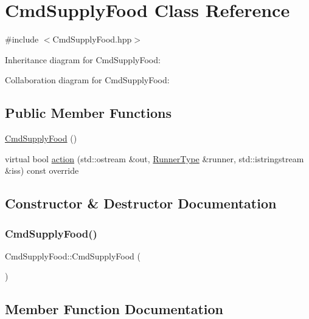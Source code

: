 \hypertarget{classCmdSupplyFood}{}\section{Cmd\+Supply\+Food Class Reference}
\label{classCmdSupplyFood}


{\ttfamily \#include $<$Cmd\+Supply\+Food.\+hpp$>$}



Inheritance diagram for Cmd\+Supply\+Food\+:


Collaboration diagram for Cmd\+Supply\+Food\+:
\subsection*{Public Member Functions}
\begin{DoxyCompactItemize}
\item 
\hyperlink{classCmdSupplyFood_a8cd9e12031a2c93b4d5092920729f88a}{Cmd\+Supply\+Food} ()
\item 
virtual bool \hyperlink{classCmdSupplyFood_a308e5fdbe783d0ba6cf504188d8d41ba}{action} (std\+::ostream \&out, \hyperlink{Command_8hpp_a3594ceaf3c835811a9a67810e7af19f9}{Runner\+Type} \&runner, std\+::istringstream \&iss) const override
\end{DoxyCompactItemize}


\subsection{Constructor \& Destructor Documentation}
\mbox{\label{classCmdSupplyFood_a8cd9e12031a2c93b4d5092920729f88a}} 
\subsubsection{\texorpdfstring{Cmd\+Supply\+Food()}{CmdSupplyFood()}}
{\footnotesize\ttfamily Cmd\+Supply\+Food\+::\+Cmd\+Supply\+Food (\begin{DoxyParamCaption}{ }\end{DoxyParamCaption})}



\subsection{Member Function Documentation}
\mbox{\label{classCmdSupplyFood_a308e5fdbe783d0ba6cf504188d8d41ba}} 
